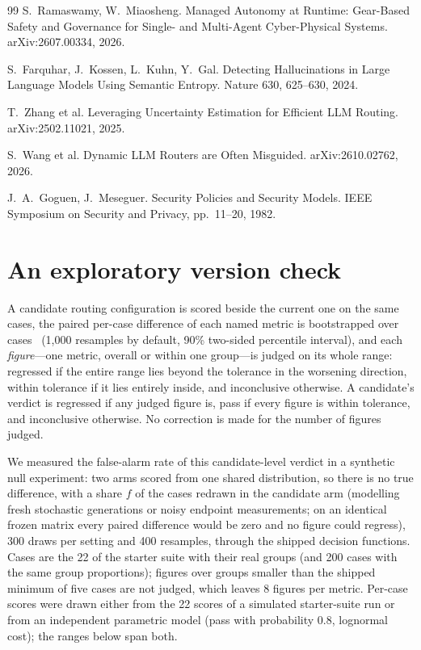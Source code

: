 \documentclass[11pt]{article}
\newcommand{\ubreak}{\textunderscore\allowbreak}
\newcommand{\code}[1]{{\ttfamily\let\_\ubreak #1}}
\begin{document}
\begin{thebibliography}{99}
 S.~Ramaswamy, W.~Miaosheng. Managed Autonomy at Runtime: Gear-Based Safety
and Governance for Single- and Multi-Agent Cyber-Physical Systems. arXiv:2607.00334, 2026.

 S.~Farquhar, J.~Kossen, L.~Kuhn, Y.~Gal. Detecting Hallucinations in
Large Language Models Using Semantic Entropy. Nature 630, 625--630, 2024.

 T.~Zhang et al. Leveraging Uncertainty Estimation for Efficient LLM
Routing. arXiv:2502.11021, 2025.

 S.~Wang et al. Dynamic LLM Routers are Often Misguided. arXiv:2610.02762,
2026.

 J.~A.~Goguen, J.~Meseguer. Security Policies and Security Models. IEEE Symposium
on Security and Privacy, pp.~11--20, 1982.

\end{thebibliography}

\appendix
\section{An exploratory version check}
\label{app:version}

A candidate routing configuration is
scored beside the current one on the same cases, the paired per-case difference of each named
metric is bootstrapped over cases~\cite{efron} (1{,}000 resamples by default, 90\% two-sided
percentile interval), and each \emph{figure}---one metric, overall or within one group---is
judged on its whole range: \code{regressed} if the entire range lies beyond the tolerance in
the worsening direction, \code{within tolerance} if it lies entirely inside, and
\code{inconclusive} otherwise. A candidate's verdict is \code{regressed} if any judged figure
is, \code{pass} if every figure is \code{within tolerance}, and \code{inconclusive} otherwise.
No correction is made for the number of figures judged.

We measured the false-alarm rate of this candidate-level verdict in a synthetic null
experiment: two arms scored from one shared distribution, so there is no true difference, with
a share $f$ of the cases redrawn in the candidate arm (modelling fresh stochastic generations or
noisy endpoint measurements; on an identical frozen matrix every paired difference would be
zero and no figure could regress), 300 draws per setting and 400 resamples, through the shipped
decision functions. Cases are the 22 of the starter suite with their real groups (and 200
cases with the same group proportions); figures over groups smaller than the shipped minimum of
five cases are not judged, which leaves 8 figures per metric. Per-case scores were drawn either
from the 22 scores of a simulated starter-suite run or from an independent parametric model
(pass with probability 0.8, lognormal cost); the ranges below span both.
\end{document}
